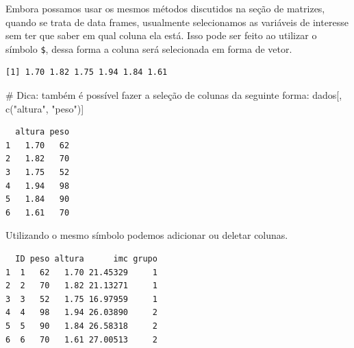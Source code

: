 \documentclass[
  letterpaper,
  DIV=11,
  numbers=noendperiod]{scrreprt}
\newenvironment{Shaded}{\begin{snugshade}}{\end{snugshade}}
\newcommand{\CommentTok}[1]{\textcolor[rgb]{0.37,0.37,0.37}{#1}}
\newcommand{\DecValTok}[1]{\textcolor[rgb]{0.68,0.00,0.00}{#1}}
\newcommand{\FunctionTok}[1]{\textcolor[rgb]{0.28,0.35,0.67}{#1}}
\newcommand{\NormalTok}[1]{\textcolor[rgb]{0.00,0.23,0.31}{#1}}
\newcommand{\OtherTok}[1]{\textcolor[rgb]{0.00,0.23,0.31}{#1}}
\newcommand{\SpecialCharTok}[1]{\textcolor[rgb]{0.37,0.37,0.37}{#1}}
\newcommand{\StringTok}[1]{\textcolor[rgb]{0.13,0.47,0.30}{#1}}
\begin{document}
Embora possamos usar os mesmos métodos discutidos na seção de matrizes,
quando se trata de data frames, usualmente selecionamos as variáveis de
interesse sem ter que saber em qual coluna ela está. Isso pode ser feito
ao utilizar o símbolo \texttt{\$}, dessa forma a coluna será selecionada
em forma de vetor.

\begin{Shaded}
\end{Shaded}

\begin{verbatim}
[1] 1.70 1.82 1.75 1.94 1.84 1.61
\end{verbatim}

\begin{Shaded}
\begin{Highlighting}[]
\CommentTok{\# Dica: também é possível fazer a seleção de colunas da seguinte forma:}
\NormalTok{dados[, }\FunctionTok{c}\NormalTok{(}\StringTok{"altura"}\NormalTok{, }\StringTok{"peso"}\NormalTok{)]}
\end{Highlighting}
\end{Shaded}

\begin{verbatim}
  altura peso
1   1.70   62
2   1.82   70
3   1.75   52
4   1.94   98
5   1.84   90
6   1.61   70
\end{verbatim}

Utilizando o mesmo símbolo podemos adicionar ou deletar colunas.

\begin{Shaded}
\end{Shaded}

\begin{verbatim}
  ID peso altura      imc grupo
1  1   62   1.70 21.45329     1
2  2   70   1.82 21.13271     1
3  3   52   1.75 16.97959     1
4  4   98   1.94 26.03890     2
5  5   90   1.84 26.58318     2
6  6   70   1.61 27.00513     2
\end{verbatim}
\end{document}
